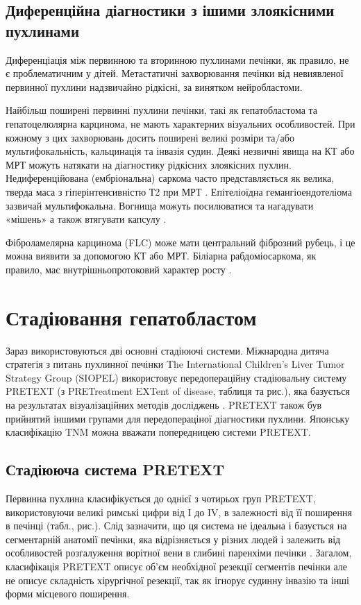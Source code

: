 \subsection{Диференційна діагностики з ішими злоякісними пухлинами}
Диференціація між первинною та вторинною пухлинами печінки, як правило, не є проблематичним у дітей. Метастатичні захворювання печінки від невиявленої первинної пухлини надзвичайно рідкісні, за винятком нейробластоми.

Найбільш поширені первинні пухлини печінки, такі як гепатобластома та гепатоцелюлярна карцинома, не мають характерних візуальних особливостей. При кожному з цих захворювань досить поширені великі розміри та/або мультифокальність, кальцинація та інвазія судин. Деякі незвичні явища на КТ або МРТ можуть натякати на діагностику рідкісних злоякісних пухлин. Недиференційована (ембріональна) саркома часто представляється як велика, тверда маса з гіперінтенсивністю Т2 при МРТ \cite{pmid22201955}. Епітеліоїдна гемангіоендотеліома зазвичай мультифокальна. Вогнища можуть посилюватися та нагадувати «мішень» а також втягувати капсулу \cite{pmid22648963}.

Фіброламелярна карцинома (FLC) може мати центральний фіброзний рубець, і це можна виявити за допомогою КТ або МРТ. Біліарна рабдоміосаркома, як правило, має внутрішньопротоковий характер росту \cite{pmid22648979}.


\section{Стадіювання гепатобластом}
Зараз використовуються дві основні стадіюючі системи. Міжнародна дитяча стратегія з питань пухлинної печінки The International Children’s Liver Tumor Strategy Group (SIOPEL) використовує передопераційну стадіювальну систему PRETEXT (з PRETreatment EXTent of disease, таблиця  та рис.), яка базується на результатах візуалізаційних методів досліджень \cite{pmid22702740}. PRETEXT також був прийнятий іншими групами для передопераціної діагностики пухлини. Японську класифікацію TNM \cite{pmid22760493} можна вважати попередницею системи PRETEXT.

\subsection{Стадіююча система PRETEXT}
Первинна пухлина класифікується до однієї з чотирьох груп PRETEXT, використовуючи великі римські цифри від I до IV, в залежності від її поширення в печінці (табл., рис.). Слід зазначити, що ця система не ідеальна і базується на сегментарній анатомії печінки, яка відрізняється у різних людей і залежить від особливостей розгалуження ворітної вени в глибині паренхіми печінки \cite{pmid22760520}. Загалом, класифікація PRETEXT описує об’єм необхідної резекції сегментів печінки але не описує складність хірургічної резекції, так як ігнорує судинну інвазію та інші форми місцевого поширення.

